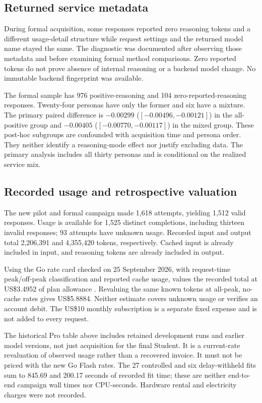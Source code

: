 \subsection{Returned service metadata}
During formal acquisition, some responses reported zero reasoning tokens and a different usage-detail structure while request settings and the returned model name stayed the same. The diagnostic was documented after observing those metadata and before examining formal method comparisons. Zero reported tokens do not prove absence of internal reasoning or a backend model change. No immutable backend fingerprint was available.

The formal sample has 976 positive-reasoning and 104 zero-reported-reasoning responses. Twenty-four personas have only the former and six have a mixture. The primary paired difference is $-0.00299$ ($[-0.00496,-0.00121]$) in the all-positive group and $-0.00405$ ($[-0.00770,-0.00117]$) in the mixed group. These post-hoc subgroups are confounded with acquisition time and persona order. They neither identify a reasoning-mode effect nor justify excluding data. The primary analysis includes all thirty personas and is conditional on the realized service mix.

\subsection{Recorded usage and retrospective valuation}
\label{sec:cost_summary}
The new pilot and formal campaign made 1,618 attempts, yielding 1,512 valid responses. Usage is available for 1,525 distinct completions, including thirteen invalid responses; 93 attempts have unknown usage. Recorded input and output total 2,206,391 and 4,355,420 tokens, respectively. Cached input is already included in input, and reasoning tokens are already included in output.

Using the Go rate card checked on 25 September 2026, with request-time peak/off-peak classification and reported cache usage, values the recorded total at US\$3.4952 of plan allowance \citep{opencode2026go}. Revaluing the same known tokens at all-peak, no-cache rates gives US\$5.8884. Neither estimate covers unknown usage or verifies an account debit. The US\$10 monthly subscription is a separate fixed expense and is not added to every request.


The historical Pro table above includes retained development runs and earlier model versions, not just acquisition for the final Student. It is a current-rate revaluation of observed usage rather than a recovered invoice. It must not be priced with the new Go Flash rates. The 27 controlled and six delay-withheld fits sum to 845.69 and 200.17 seconds of recorded fit time; these are neither end-to-end campaign wall times nor CPU-seconds. Hardware rental and electricity charges were not recorded.

